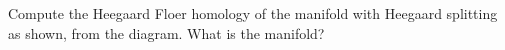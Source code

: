 

Compute the Heegaard Floer homology of the manifold with Heegaard splitting as shown, from the diagram. What is the manifold?


